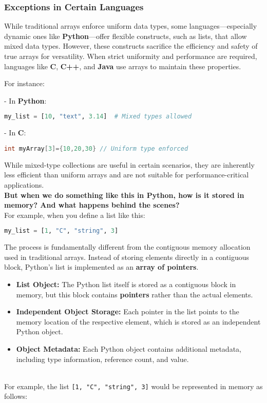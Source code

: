 \documentclass[12pt, oneside]{book}
\begin{document}
\subsubsection{Exceptions in Certain Languages}

While traditional arrays enforce uniform data types, some languages—especially dynamic ones like \textbf{Python}—offer flexible constructs, such as lists, that allow mixed data types. However, these constructs sacrifice the efficiency and safety of true arrays for versatility. When strict uniformity and performance are required, languages like \textbf{C}, \textbf{C++}, and \textbf{Java} use arrays to maintain these properties.

For instance:

- In \textbf{Python}:
\begin{lstlisting}[language=Python]
	my_list = [10, "text", 3.14]  # Mixed types allowed
\end{lstlisting}

- In \textbf{C}:
\begin{lstlisting}[language=C]
	int myArray[3]={10,20,30} // Uniform type enforced
\end{lstlisting}

While mixed-type collections are useful in certain scenarios, they are inherently less efficient than uniform arrays and are not suitable for performance-critical applications.\\
\textbf{But when we do something like this in Python, how is it stored in memory? And what happens behind the scenes?}\\
For example, when you define a list like this:  
\begin{lstlisting}[language=Python]
	my_list = [1, "C", "string", 3]
\end{lstlisting}
The process is fundamentally different from the contiguous memory allocation used in traditional arrays. Instead of storing elements directly in a contiguous block, Python’s list is implemented as an \textbf{array of pointers}.
\begin{itemize}
	\item \textbf{List Object:} The Python list itself is stored as a contiguous block in memory, but this block contains \textbf{pointers} rather than the actual elements.
	\item  \textbf{Independent Object Storage:} Each pointer in the list points to the memory location of the respective element, which is stored as an independent Python object.
	\item  \textbf{Object Metadata:} Each Python object contains additional metadata, including type information, reference count, and value.
\end{itemize}
\\
For example, the list \texttt{[1, "C", "string", 3]} would be represented in memory as follows:
\end{document}
